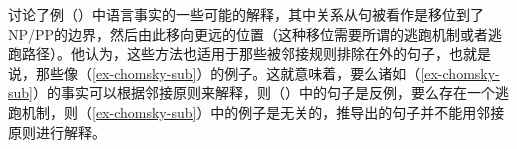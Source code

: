  \citet[--54]{Koster78b-u}讨论了例（）中语言事实的一些可能的解释，其中关系从句被看作是移位到了NP/PP的边界，然后由此移向更远的位置（这种移位需要所谓的逃跑机制或者逃跑路径）。他认为，这些方法也适用于那些被邻接规则排除在外的句子，也就是说，那些像（\ref{ex-chomsky-sub}）的例子。这就意味着，要么诸如（\ref{ex-chomsky-sub}）的事实可以根据邻接原则来解释，则（）中的句子是反例，要么存在一个逃跑机制，则（\ref{ex-chomsky-sub}）中的例子是无关的，推导出的句子并不能用邻接原则进行解释。

